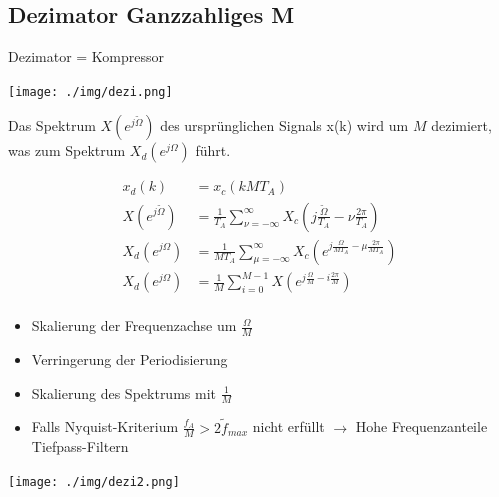 \documentclass[10pt,a4paper]{article}
\begin{document}
\subsection{Dezimator Ganzzahliges M}
Dezimator = Kompressor 
  \begin{center}
      \texttt{[image: ./img/dezi.png]}
  \end{center}
Das Spektrum $X(e^{j\tilde{\Omega}})$ des ursprünglichen Signals x(k) wird um $M$ dezimiert,
was zum Spektrum $X_d(e^{j\Omega})$ führt.
  \begin{mdframed}[style=exercise]
    \begin{align}
        x_d(k)&=x_c(kMT_A)\\
        X(e^{j\tilde{\Omega}})&=\frac{1}{T_A}\sum_{\nu=-\infty}^{\infty} X_c(j\frac{\tilde{\Omega}}{T_A} -\nu\frac{2\pi}{T_A})\\
        X_d(e^{j\Omega})&=\frac{1}{MT_A}\sum_{\mu=-\infty}^{\infty} X_c(e^{j\frac{\Omega}{MT_A} -\mu\frac{2\pi}{MT_A}})\\
        X_d(e^{j\Omega})&=\frac{1}{M}\sum_{i=0}^{M-1} X(e^{j\frac{\Omega}{M} -i\frac{2\pi}{M}})\\
    \end{align}
  \end{mdframed}
  \begin{itemize}
    \item Skalierung der Frequenzachse um $\frac{\Omega}{M}$
    \item Verringerung der Periodisierung
    \item Skalierung des Spektrums mit $\frac{1}{M}$
    \item Falls Nyquist-Kriterium $\frac{f_A}{M}>2\tilde{f}_{max}$ nicht erfüllt $\rightarrow$ Hohe Frequenzanteile Tiefpass-Filtern 
  \end{itemize}
  \begin{center}
      \texttt{[image: ./img/dezi2.png]}
  \end{center}
\end{document}
